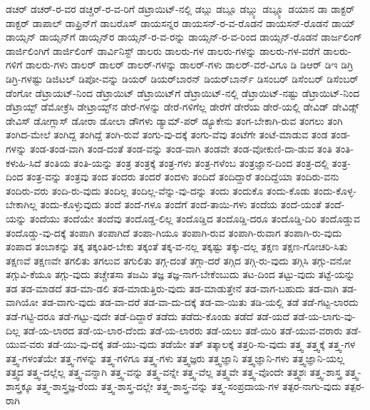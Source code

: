 {ಡಚರ್‌
ಡಚರ್‌-ರ-ವರ
ಡಚ್ಚರ್‌-ರ-ವ-ರಿಗೆ
ಡಟ್ರಾಯಿಟ್‌-ನಲ್ಲಿ
ಡಬ್ಲು
ಡಬ್ಲೂ
ಡಬ್ಲ್ಯು
ಡಬ್ಲ್ಯೂ
ಡಯಾನ
ಡಾ
ಡಾಕ್ಟರ್
ಡಾಕ್ಟರ್‌
ಡಾಪಾಲ್
ಡಾಫ್ರಿನ್‌ಗೆ
ಡಾಬರೊಸ್‌
ಡಾಯಸನ್ನರ
ಡಾಯಸನ್‌-ರ-ವ-ರೊಡನೆ
ಡಾಯಸನ್‌-ರೊಡನೆ
ಡಾಯ್
ಡಾಯ್ಸನ್
ಡಾಯ್ಸನ್‌ಗೆ
ಡಾಯ್ಸನ್‌ರ
ಡಾಯ್ಸನ್‌-ರ-ವ-ರನ್ನು
ಡಾಯ್ಸನ್‌-ರ-ವ-ರಿಂದ
ಡಾಯ್ಸನ್‌-ರೊಡನೆ
ಡಾರ್ಜಲಿಂಗ್
ಡಾರ್ಜಿಲಿಂಗಿಗೆ
ಡಾರ್ಜಿಲಿಂಗ್
ಡಾರ್ವಿನಿಸ್ಟ್
ಡಾಲರು
ಡಾಲರು-ಗಳ
ಡಾಲರು-ಗಳನ್ನು
ಡಾಲರು-ಗಳ-ವರೆಗೆ
ಡಾಲರು-ಗಳಿಗೆ
ಡಾಲರು-ಗಳು
ಡಾಲರ್
ಡಾಲರ್‌
ಡಾಲರ್‌-ಗಳನ್ನು
ಡಾಲರ್‌-ಗಳು
ಡಾಲರ್‌-ವರೆ-ವಿಗೂ
ಡಿ
ಡಿಆರ್
ಡಿಇ
ಡಿಗ್ರಿ
ಡಿಗ್ರಿ-ಗಳಷ್ಟು
ಡಿಜಿಟಲ್
ಡಿಪೋ-ವನ್ನು
ಡಿಯರ್
ಡಿಯರ್‌ಬಾರನ್
ಡಿಯರ್‌ಬಾರ್ನ್
ಡಿಸಂಬರ್
ಡಿಸೆಂಬರ್
ಡಿಸೆಂಬರ್‌
ಡೆಂಗೋ
ಡೆಟ್ರಾಯಟ್‌-ನಿಂದ
ಡೆಟ್ರಾಯಿಟ್
ಡೆಟ್ರಾಯಿಟ್‌ಗೆ
ಡೆಟ್ರಾಯಿಟ್‌-ನಲ್ಲಿ
ಡೆಟ್ರಾಯಿಟ್‌-ನಷ್ಟು
ಡೆಟ್ರಾಯಿಟ್‌-ನಿಂದ
ಡೆಟ್ರಾಯ್ಟ್
ಡೆಮೋಕ್ರೆಸಿ
ಡೇಟ್ರಾಯ್ಟ್‌ನ
ಡೇರೆ-ಗಳನ್ನು
ಡೇರೆ-ಗಳಿಗೆಲ್ಲ
ಡೇರೆಗೆ
ಡೇರೆಯ
ಡೇರೆ-ಯಲ್ಲಿ
ಡೇವಿಡ್
ಡೇವಿಡ್ಸ್
ಡೇವಿಸ್‌
ಡೋಗ್ಲಾಸ್
ಡೋರಾ
ಡೋಲಾ
ಡೌಗಳು
ಡ್ಯಾಮ್‌-ಪರ್
ಡ್ಯೂಕೇನು
ತಂಗ-ಬೇಕಾಗಿ-ರುವ
ತಂಗಲು
ತಂಗಿ
ತಂಗಿದ-ಮೇಲೆ
ತಂಗಿದ್ದ
ತಂಗಿದ್ದೆ
ತಂಗಿ-ರುವೆ
ತಂಗು-ವು-ದಕ್ಕೆ
ತಂಗು-ವೆವು
ತಂಟೆಗೇ
ತಂಟೆ-ಮಾಡುವ
ತಂಡ
ತಂಡ-ಗಳನ್ನು
ತಂಡ-ತಂಡ-ವಾಗಿ
ತಂಡ-ದಂತೆ
ತಂಡ-ವನ್ನು
ತಂಡ-ವಾಗಿ
ತಂಡವೇ
ತಂಡ-ವೋಕುಣಿ-ದಾ-ಡುವ
ತಂತಿ
ತಂತಿ-ಕಳುಹಿ-ಸಿದೆ
ತಂತಿಯ
ತಂತಿ-ಯನ್ನು
ತಂತ್ರ
ತಂತ್ರಕ್ಕೆ
ತಂತ್ರ-ಗಳು
ತಂತ್ರ-ಗಳೆಂಬ
ತಂತ್ರಜ್ಞಾನ-ದಿಂದ
ತಂತ್ರ-ದಲ್ಲಿ
ತಂತ್ರ-ದಿಂದ
ತಂತ್ರ-ವನ್ನು
ತಂತ್ರವು
ತಂದ
ತಂದರು
ತಂದರೆ
ತಂದಳು
ತಂದಿದೆ
ತಂದಿದ್ದಾರೆ
ತಂದಿದ್ದೆಯಾ
ತಂದಿರು-ವನು
ತಂದಿರು-ವರು
ತಂದಿ-ರು-ವುದು
ತಂದಿಲ್ಲ
ತಂದಿಲ್ಲ-ವೆನ್ನು-ವು-ದನ್ನು
ತಂದು
ತಂದುಕೊ
ತಂದು-ಕೊಡು
ತಂದು-ಕೊಳ್ಳ-ಬೇಕಾಗಿಲ್ಲ
ತಂದು-ಕೊಳ್ಳುವುದು
ತಂದೆ
ತಂದೆ-ಗಳೂ
ತಂದೆಗೆ
ತಂದೆ-ತಾಯಿ-ಗಳು
ತಂದೆಯ
ತಂದೆ-ಯಂತೆ
ತಂದೆ-ಯನ್ನು
ತಂದೆಯು
ತಂದೆಯೇ
ತಂದೆವು
ತಂದೊಡ್ಡ-ಲಿಲ್ಲ
ತಂದೊಡ್ಡಿದ
ತಂದೊಡ್ಡಿ-ದರೂ
ತಂದೊಡ್ಡಿ-ದಿರಿ
ತಂದೊಡ್ಡುವ
ತಂದೊಡ್ಡು-ವು-ದಕ್ಕೆ
ತಂಪಾಗಿ
ತಂಪಾಗಿದೆ
ತಂಪಾ-ಗಿಯೂ
ತಂಪಾಗಿ-ರುವ
ತಂಪಾಗಿ-ರುವಾಗ
ತಂಪಾಗಿ-ರು-ವುದು
ತಂಪಾದ
ತಂಬಾಕನ್ನು
ತಕ್ಕ
ತಕ್ಕಂತಿರ-ಬೇಕು
ತಕ್ಕಂತೆ
ತಕ್ಕ-ವ-ನಲ್ಲ
ತಕ್ಕಷ್ಟು
ತಕ್ಕು-ದಲ್ಲ
ತಕ್ಷಣ
ತಕ್ಷಣ-ಗೋಚರಿ-ಸಿತು
ತಕ್ಷಣವೆ
ತಕ್ಷಣವೇ
ತಗಲಿತು
ತಗಲುವ
ತಗುಲಿತು
ತಗ್ಗ-ದಂತೆ
ತಗ್ಗಾ-ದರೆ
ತಗ್ಗಿದ
ತಗ್ಗಿ-ರು-ವುದು
ತಗ್ಗಿಸಿ
ತಗ್ಗು-ವನೋ
ತಗ್ಗುವಿ-ಕೆಯೂ
ತಗ್ಗು-ವುದು
ತಚ್ಚೇತಸಾ
ತಜಮಿ
ತಜ್ಞ
ತಜ್ಞ-ನಾಗ-ಬೇಕೆಂಬುದು
ತಟ-ದಿಂದ
ತಟ್ಟು-ವುದು
ತಟ್ಟೆ-ಯನ್ನು
ತಡ
ತಡ-ಮಾಡದೆ
ತಡ-ಮಾ-ಡಲಿ
ತಡ-ಮಾಡುತ್ತಿರು-ವುದು
ತಡ-ಮಾಡುತ್ತೇನೆ
ತಡ-ವಾಗ-ಬಹುದು
ತಡ-ವಾಗಿ
ತಡ-ವಾಗಿಯೋ
ತಡ-ವಾಗು-ವುದು
ತಡ-ವಾ-ದರೆ
ತಡ-ವಾ-ದು-ದಕ್ಕೆ
ತಡ-ವಾ-ಯಿತು
ತಡಿ-ಯಲ್ಲಿ
ತಡೆ
ತಡೆ-ಗಟ್ಟ-ಲಾರದು
ತಡೆ-ಗಟ್ಟಿ-ದರೂ
ತಡೆ-ಗಟ್ಟು-ವುದೇ
ತಡೆ-ದಿದ್ದಾರೆ
ತಡೆದು
ತಡೆದು-ಕೊಂಡು
ತಡೆದೆ
ತಡೆ-ಯದೆ
ತಡೆ-ಯ-ಲಾಗು-ವು-ದಿಲ್ಲ
ತಡೆ-ಯ-ಲಾರದ
ತಡೆ-ಯ-ಲಾರ-ದೆಂದು
ತಡೆ-ಯ-ಲಾರರು
ತಡೆ-ಯಲು
ತಡೆ-ಯಿರಿ
ತಡೆ-ಯುವ-ವರಾರು
ತಡೆ-ಯುವ-ವರು
ತಡೆ-ಯು-ವು-ದಕ್ಕೆ
ತಡೆ-ಯು-ವುದು
ತಡೆಯೇ
ತತ್
ತತ್ಕಾಲಕ್ಕೆ
ತತ್ತರಿ-ಸು-ವುದು
ತತ್ತ್ವ
ತತ್ತ್ವಕ್ಕೆ
ತತ್ತ್ವ-ಗಳ
ತತ್ತ್ವ-ಗಳಂತೆಯೇ
ತತ್ತ್ವ-ಗಳನ್ನು
ತತ್ತ್ವ-ಗಳಿಗೂ
ತತ್ತ್ವ-ಗಳು
ತತ್ತ್ವಜ್ಞರು
ತತ್ತ್ವಜ್ಞಾನಿ
ತತ್ತ್ವಜ್ಞಾನಿ-ಗಳು
ತತ್ತ್ವಜ್ಞಾನಿ-ಯಲ್ಲ
ತತ್ತ್ವದ
ತತ್ತ್ವ-ದಲ್ಲೆಲ್ಲ
ತತ್ತ್ವ-ವನ್ನಾಗಿ
ತತ್ತ್ವ-ವನ್ನು
ತತ್ತ್ವ-ವನ್ನೇ
ತತ್ತ್ವ-ವೆಲ್ಲ
ತತ್ತ್ವವೇ
ತತ್ತ್ವ-ವೊಂದೇ
ತತ್ತ್ವಶಃ
ತತ್ತ್ವ-ಶಾಸ್ತ್ರ
ತತ್ತ್ವ-ಶಾಸ್ತ್ರಕ್ಕೂ
ತತ್ತ್ವ-ಶಾಸ್ತ್ರಜ್ಞ-ರೆಂದು
ತತ್ತ್ವ-ಶಾಸ್ತ್ರ-ದಲ್ಲೇ
ತತ್ತ್ವ-ಶಾಸ್ತ್ರ-ವನ್ನು
ತತ್ತ್ವ-ಸಂಪ್ರದಾಯ-ಗಳ
ತತ್ಪರ-ನಾಗು-ವುದು
ತತ್ಪರ-ರಾಗಿ
}
